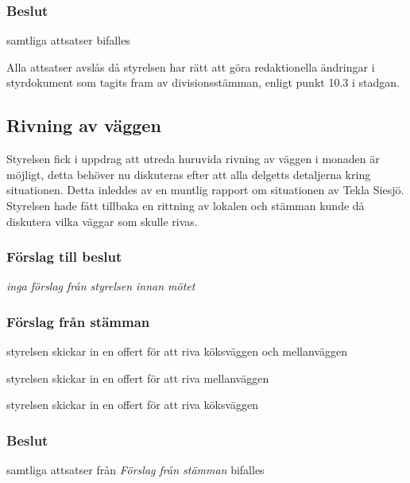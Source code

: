 \documentclass[protokoll]{dvd}
\begin{document}
\subsubsection*{Beslut}
\begin{attsatser}
    \item samtliga attsatser bifalles
\end{attsatser}
Alla attsatser avslås då styrelsen har rätt att göra redaktionella ändringar i styrdokument som tagits 
fram av divisionsstämman, enligt punkt 10.3 i stadgan.

\subsection{Rivning av väggen}
Styrelsen fick i uppdrag att utreda huruvida rivning av väggen i monaden är möjligt,
detta behöver nu diskuteras efter att alla delgetts detaljerna kring situationen.
Detta inleddes av en muntlig rapport om situationen av Tekla Siesjö.
Styrelsen hade fått tillbaka en rittning av lokalen och stämman kunde då diskutera 
vilka väggar som skulle rivas. 

\subsubsection*{Förslag till beslut}
\begin{attsatser}
	\item \emph{inga förslag från styrelsen innan mötet}
\end{attsatser}
\subsubsection*{Förslag från stämman}
\begin{attsatser}
	\item styrelsen skickar in en offert för att riva köksväggen och mellanväggen
	\item styrelsen skickar in en offert för att riva mellanväggen
	\item styrelsen skickar in en offert för att riva köksväggen
\end{attsatser}
\subsubsection*{Beslut}
\begin{attsatser}
    \item samtliga attsatser från \emph{Förslag från stämman} bifalles
\end{attsatser}
\end{document}
